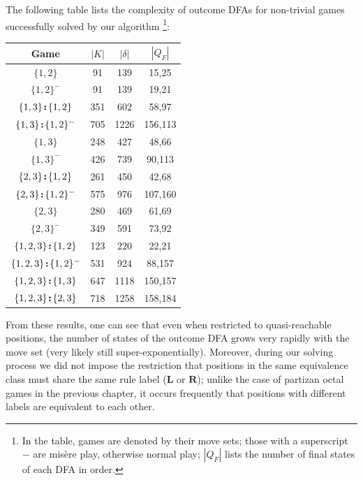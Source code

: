 \documentclass[11pt]{article}
\theoremstyle{definition}
\theoremstyle{plain}
\newcommand{\rmL}{\mathbf{L}}
\newcommand{\rmR}{\mathbf{R}}
\newcommand{\col}{\textbf{\;\!:\!\;}}
\begin{document}
The following table lists the complexity of outcome DFAs for non-trivial games successfully solved by our algorithm
\footnote{In the table, games are denoted by their move sets; those with a superscript $-$ are misère play, otherwise normal play; $|Q_F|$ lists the number of final states of each DFA in order.}:

\begin{center}
    \begin{tabular}{|c|c|c|c|}
        \hline
        Game & $|K|$ & $|\delta|$ & $|Q_F|$ \\
        \hline
        $\{1, 2\}$               & 91  & 139  & 15,25 \\
        $\{1, 2\}^-$             & 91  & 139  & 19,21 \\
        $\{1,3\}\col\{1,2\}$     & 351 & 602  & 58,97 \\
        $\{1,3\}\col\{1,2\}^-$   & 705 & 1226 & 156,113 \\
        $\{1,3\}$                & 248 & 427  & 48,66 \\
        $\{1,3\}^-$              & 426 & 739  & 90,113 \\
        $\{2,3\}\col\{1,2\}$     & 261 & 450  & 42,68 \\
        $\{2,3\}\col\{1,2\}^-$   & 575 & 976  & 107,160 \\
        $\{2,3\}$                & 280 & 469  & 61,69 \\
        $\{2,3\}^-$              & 349 & 591  & 73,92 \\
        $\{1,2,3\}\col\{1,2\}$   & 123 & 220  & 22,21 \\
        $\{1,2,3\}\col\{1,2\}^-$ & 531 & 924  & 88,157 \\
        $\{1,2,3\}\col\{1,3\}$   & 647 & 1118 & 150,157 \\
        $\{1,2,3\}\col\{2,3\}$   & 718 & 1258 & 158,184 \\
        \hline
    \end{tabular}
\end{center}


From these results, one can see that even when restricted to quasi-reachable positions, the number of states of the outcome DFA grows very rapidly with the move set (very likely still super-exponentially).
Moreover, during our solving process we did not impose the restriction that positions in the same equivalence class must share the same rule label ($\rmL$ or $\rmR$); unlike the case of partizan octal games in the previous chapter, it occurs frequently that positions with different labels are equivalent to each other.
\end{document}
